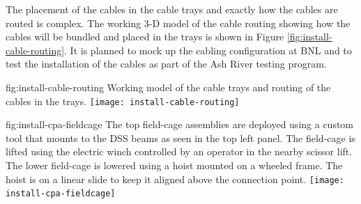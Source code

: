 The placement of the cables in the cable trays and exactly how the cables are routed is complex. The working 3-D model of the cable routing showing how the cables will be bundled and placed in the trays is shown in Figure \ref{fig:install-cable-routing}. It is planned to mock up the cabling configuration at BNL and to test the installation of the cables as part of the Ash River testing program.

\begin{dunefigure}{fig:install-cable-routing}
  {Working model of the cable trays and routing of the cables in the trays.}
\texttt{[image: install-cable-routing]}
\end{dunefigure}


\begin{dunefigure}{fig:install-cpa-fieldcage}
  {The top field-cage assemblies are deployed using a custom tool that mounts to the DSS beams as seen in the top left panel. The field-cage is lifted using the electric winch controlled by an operator in the nearby scissor lift. The lower field-cage is lowered using a hoist mounted on a wheeled frame. The hoist is on a linear slide to keep it aligned above the connection point.}
\texttt{[image: install-cpa-fieldcage]}
\end{dunefigure}

